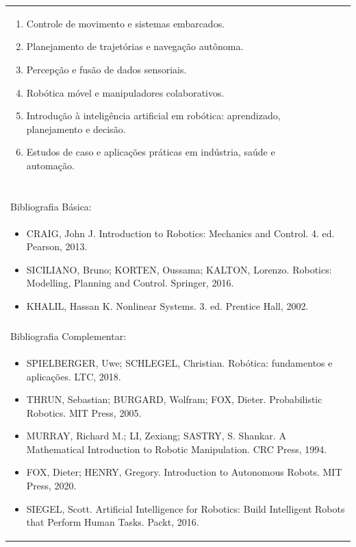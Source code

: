 \documentclass[11pt]{article}
\begin{document}
\begin{center}
\begin{longtable}{|p{4cm}|p{4cm}|p{4cm}|p{4cm}|}
{\begin{enumerate}
\item Controle de movimento e sistemas embarcados.
\item Planejamento de trajetórias e navegação autônoma.
\item Percepção e fusão de dados sensoriais.
\item Robótica móvel e manipuladores colaborativos.
\item Introdução à inteligência artificial em robótica: aprendizado, planejamento e decisão.
\item Estudos de caso e aplicações práticas em indústria, saúde e automação.\end{enumerate}}\\
\multicolumn{4}{|p{16cm}|}{}\\
\multicolumn{4}{|p{16cm}|}{}\\
\multicolumn{4}{|p{16cm}|}{\vspace{-1cm}}\\
\multicolumn{4}{|p{16cm}|}{}\\
\hline
\multicolumn{4}{|p{16cm}|}{Bibliografia Básica:}\\
\multicolumn{4}{|p{16cm}|}{%
\begin{itemize}\item CRAIG, John J. Introduction to Robotics: Mechanics and Control. 4. ed. Pearson, 2013.
\item SICILIANO, Bruno; KORTEN, Oussama; KALTON, Lorenzo. Robotics: Modelling, Planning and Control. Springer, 2016.
\item KHALIL, Hassan K. Nonlinear Systems. 3. ed. Prentice Hall, 2002.\end{itemize}}\\
\multicolumn{4}{|p{16cm}|}{}\\
\hline
\multicolumn{4}{|p{16cm}|}{Bibliografia Complementar:}\\
\multicolumn{4}{|p{16cm}|}{%
\begin{itemize}\item SPIELBERGER, Uwe; SCHLEGEL, Christian. Robótica: fundamentos e aplicações. LTC, 2018.
\item THRUN, Sebastian; BURGARD, Wolfram; FOX, Dieter. Probabilistic Robotics. MIT Press, 2005.
\item MURRAY, Richard M.; LI, Zexiang; SASTRY, S. Shankar. A Mathematical Introduction to Robotic Manipulation. CRC Press, 1994.
\item FOX, Dieter; HENRY, Gregory. Introduction to Autonomous Robots. MIT Press, 2020.
\item SIEGEL, Scott. Artificial Intelligence for Robotics: Build Intelligent Robots that Perform Human Tasks. Packt, 2016.\end{itemize}}\\
\hline
\end{longtable}
\end{center}
\end{document}
